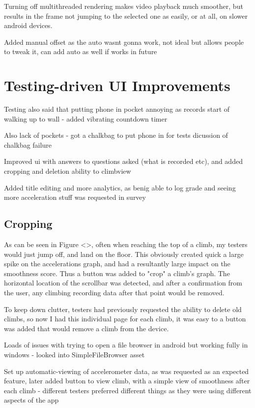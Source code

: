 Turning off multithreaded rendering makes video playback much smoother, but results in the frame not jumping to the selected one as easily, or at all, on slower android devices.


Added manual offset as the auto wasnt gonna work, not ideal but allows people to tweak it, can add auto as well if works in future








\section{Testing-driven UI Improvements}
Testing also said that putting phone in pocket annoying as records start of walking up to wall - added vibrating countdown timer


Also lack of pockets - got a chalkbag to put phone in for tests
dicussion of chalkbag failure


Improved ui with answers to questions asked (what is recorded etc), and added cropping and deletion ability to climbview


Added title editing and more analytics, as benig able to log grade and seeing more acceleration stuff was requested in survey


\subsection{Cropping}
As can be seen in Figure <>, often when reaching the top of a climb, my testers would just jump off, and land on the floor.
This obviously created quick a large spike on the accelerations graph, and had a resultantly large impact on the smoothness score.
Thus a button was added to "crop" a climb's graph.
The horizontal location of the scrollbar was detected, and after a confirmation from the user, any climbing recording data after that point would be removed.


To keep down clutter, testers had previously requested the ability to delete old climbs, so now I had this individual page for each climb, it was easy to a button was added that would remove a climb from the device.



Loads of issues with trying to open a file browser in android but working fully in windows - looked into SimpleFileBrowser asset


Set up automatic-viewing of accelerometer data, as was requested as an expected feature, later added button to view climb, with a simple view of smoothness after each climb - different testers preferred different things as they were using different aspects of the app

